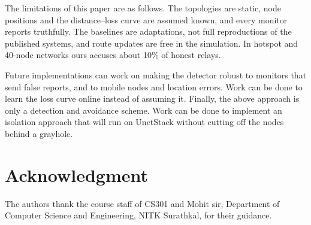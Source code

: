 \documentclass[conference]{IEEEtran}
\begin{document}
The limitations of this paper are as follows. The topologies are static, node positions and the distance--loss curve are assumed known, and every monitor reports truthfully. The baselines are adaptations, not full reproductions of the published systems, and route updates are free in the simulation. In hotspot and 40-node networks ours accuses about 10\% of honest relays.

Future implementations can work on making the detector robust to monitors that send false reports, and to mobile nodes and location errors. Work can be done to learn the loss curve online instead of assuming it. Finally, the above approach is only a detection and avoidance scheme. Work can be done to implement an isolation approach that will run on UnetStack without cutting off the nodes behind a grayhole.

\section*{Acknowledgment}
The authors thank the course staff of CS301 and Mohit sir, Department of Computer Science and Engineering, NITK Surathkal, for their guidance.
\end{document}
